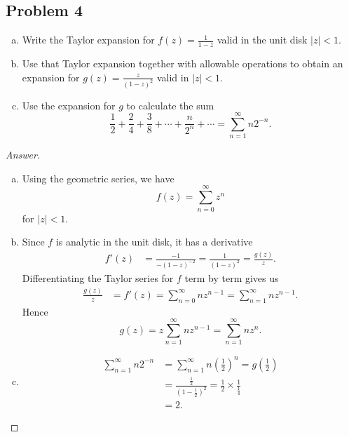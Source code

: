 \documentclass[12pt]{article}
\newcommand\paren[1]{\left( #1 \right)}
\theoremstyle{definition}
\begin{document}
\subsection{Problem 4}
\begin{enumerate}[a)]
    \item Write the Taylor expansion for $\displaystyle f(z) = \frac{1}{1 - z}$ valid in the unit disk $|z| < 1$.
    \item Use that Taylor expansion together with allowable operations to obtain an expansion for $\displaystyle g(z) = \frac{z}{(1-z)^2}$ valid in $|z| < 1$.
    \item Use the expansion for $g$ to calculate the sum 
    \[
        \frac{1}{2} + \frac{2}{4} + \frac{3}{8} + \dotsb + \frac{n}{2^n} + \dotsb = \sum\limits_{n = 1}^{\infty} n 2^{-n}.
    \]
\end{enumerate}
\begin{proof}[Answer]
    \noindent
    \begin{enumerate}[a)]
        \item Using the geometric series, we have 
        \[
            f(z) = \sum\limits_{n = 0}^{\infty} z^n
        \]
        for $|z| < 1$.
        \item Since $f$ is analytic in the unit disk, it has a derivative
        \begin{align*}
            f'(z) & = \frac{-1}{-(1-z)^{-2}} = \frac{1}{(1-z)^2} = \frac{g(z)}{z}.
        \end{align*}
        Differentiating the Taylor series for $f$ term by term gives us
        \begin{align*}
            \frac{g(z)}{z} & = f'(z) = \sum\limits_{n = 0}^{\infty} n z^{n-1} = \sum\limits_{n = 1}^{\infty} n z^{n-1}.
        \end{align*}
        Hence
        \[
            g(z) = z \sum\limits_{n = 1}^{\infty} n z^{n-1} = \sum\limits_{n = 1}^{\infty} n z^n.
        \]
        \item 
        \begin{align*}
            \sum\limits_{n = 1}^{\infty} n 2^{-n} & = \sum\limits_{n = 1}^{\infty} n \paren{ \frac{1}{2} }^n = g \paren{ \frac{1}{2} } \\
            & = \frac{ \frac{1}{2} }{ \paren{ 1 - \frac{1}{2} }^2 } = \frac{1}{2} \times \frac{1}{ \frac{1}{4} } \\
            & = \boxed{ 2. }
        \end{align*}
    \end{enumerate}
\end{proof}
\end{document}
